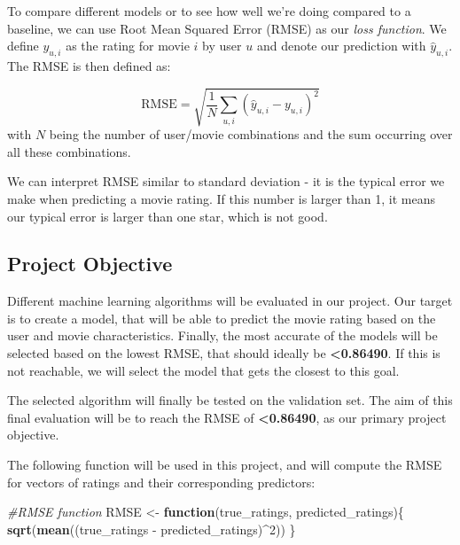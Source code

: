 \documentclass[
]{article}
\newenvironment{Shaded}{}{}
\newcommand{\CommentTok}[1]{\textcolor[rgb]{0.38,0.63,0.69}{\textit{#1}}}
\newcommand{\ControlFlowTok}[1]{\textcolor[rgb]{0.00,0.44,0.13}{\textbf{#1}}}
\newcommand{\DecValTok}[1]{\textcolor[rgb]{0.25,0.63,0.44}{#1}}
\newcommand{\KeywordTok}[1]{\textcolor[rgb]{0.00,0.44,0.13}{\textbf{#1}}}
\newcommand{\NormalTok}[1]{#1}
\newcommand{\OperatorTok}[1]{\textcolor[rgb]{0.40,0.40,0.40}{#1}}
\newcommand{\StringTok}[1]{\textcolor[rgb]{0.25,0.44,0.63}{#1}}
\begin{document}
To compare different models or to see how well we're doing compared to a
baseline, we can use Root Mean Squared Error (RMSE) as our \emph{loss
function}. We define \(y_{u,i}\) as the rating for movie \(i\) by user
\(u\) and denote our prediction with \(\hat{y}_{u,i}\). The RMSE is then
defined as:

\[
\mbox{RMSE} = \sqrt{\frac{1}{N} \sum_{u,i}^{} \left( \hat{y}_{u,i} - y_{u,i} \right)^2 }
\] with \(N\) being the number of user/movie combinations and the sum
occurring over all these combinations.

We can interpret RMSE similar to standard deviation - it is the typical
error we make when predicting a movie rating. If this number is larger
than 1, it means our typical error is larger than one star, which is not
good.

\hypertarget{project-objective}{%
\subsection{Project Objective}\label{project-objective}}

Different machine learning algorithms will be evaluated in our project.
Our target is to create a model, that will be able to predict the movie
rating based on the user and movie characteristics. Finally, the most
accurate of the models will be selected based on the lowest RMSE, that
should ideally be \textbf{\textless0.86490}. If this is not reachable,
we will select the model that gets the closest to this goal.

The selected algorithm will finally be tested on the validation set. The
aim of this final evaluation will be to reach the RMSE of
\textbf{\textless0.86490}, as our primary project objective.

The following function will be used in this project, and will compute
the RMSE for vectors of ratings and their corresponding predictors:

\begin{Shaded}
\begin{Highlighting}[]
\CommentTok{#RMSE function}
\NormalTok{RMSE <-}\StringTok{ }\ControlFlowTok{function}\NormalTok{(true_ratings, predicted_ratings)\{}
  \KeywordTok{sqrt}\NormalTok{(}\KeywordTok{mean}\NormalTok{((true_ratings }\OperatorTok{-}\StringTok{ }\NormalTok{predicted_ratings)}\OperatorTok{^}\DecValTok{2}\NormalTok{))}
\NormalTok{\}}
\end{Highlighting}
\end{Shaded}
\end{document}
